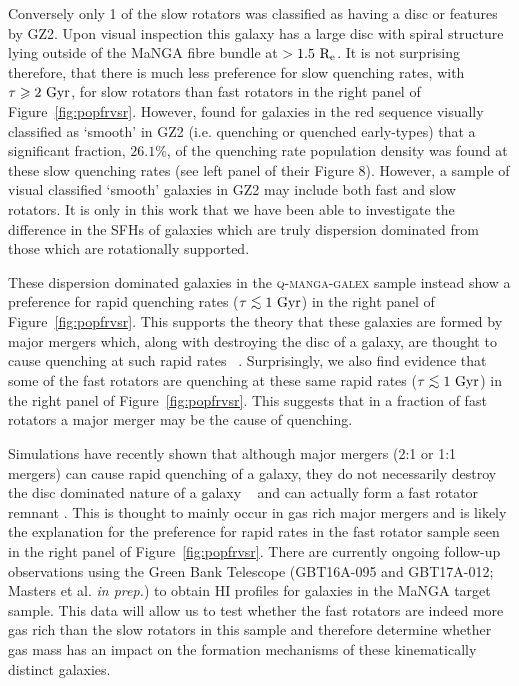 \documentclass[useAMS,usenatbib]{mn2e}
\def\lesssim{\mathrel{\hbox{\rlap{\hbox{\lower3pt\hbox{$\sim$}}}\hbox{\raise2pt\hbox{$<$}}}}}
\begin{document}
Conversely only 1 of the slow rotators was classified as having a disc or features by GZ2. Upon visual inspection this galaxy has a large disc with spiral structure lying outside of the MaNGA fibre bundle at $>1.5~\rm{R_e}$. It is not surprising therefore, that there is much less preference for slow quenching rates, with $\tau \geq 2~\rm{Gyr}$, for slow rotators than fast rotators in the right panel of Figure~\ref{fig:popfrvsr}. However, \cite{smethurst15} found for galaxies in the red sequence visually classified as `smooth' in GZ2 (i.e. quenching or quenched early-types) that a significant fraction, $26.1\%$, of the quenching rate population density was found at these slow quenching rates (see left panel of their Figure 8). However, a sample of  visual classified `smooth' galaxies in GZ2 may include both fast and slow rotators. It is only in this work that we have been able to investigate the difference in the SFHs of galaxies which are truly dispersion dominated from those which are rotationally supported.

These dispersion dominated galaxies in the \textsc{q-manga-galex} sample instead show a preference for rapid quenching rates ($\tau\lesssim1~\rm{Gyr}$) in the right panel of Figure~\ref{fig:popfrvsr}. This supports the theory that these galaxies are formed by major mergers which, along with destroying the disc of a galaxy, are thought to cause quenching at such rapid rates ~\citep{springel05b, bell06, lotz08b,lotz11,smethurst15}. Surprisingly, we also find evidence that some of the fast rotators are quenching at these same rapid rates ($\tau \lesssim 1~\rm{Gyr}$) in the right panel of Figure~\ref{fig:popfrvsr}. This suggests that in a fraction of fast rotators a major merger may be the cause of quenching. 

Simulations have recently shown that although major mergers (2:1 or 1:1 mergers) can cause rapid quenching of a galaxy, they do not necessarily destroy the disc dominated nature of a galaxy ~\citep{pontzen16, sparre16} and can actually form a fast rotator remnant \citep{bois11}. This is thought to mainly occur in gas rich major mergers \citep{bois11} and is likely the explanation for the preference for rapid rates in the fast rotator sample seen in the right panel of Figure~\ref{fig:popfrvsr}. There are currently ongoing follow-up observations using the Green Bank Telescope (GBT16A-095 and GBT17A-012; Masters et al. \emph{in prep.}) to obtain HI profiles for galaxies in the MaNGA target sample. This data will allow us to test whether the fast rotators are indeed more gas rich than the slow rotators in this sample and therefore determine whether gas mass has an impact on the formation mechanisms of these kinematically distinct galaxies. 
\end{document}
